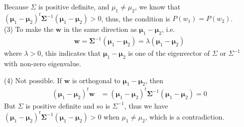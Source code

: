 \documentclass{article}
\begin{document}
Because $\Sigma$ is positive definite, and $\mu_1 \neq \mu_2$, we know that 
$(\mathbf{\mu}_1 - \mathbf{\mu}_2)^t\mathbf{\Sigma}^{-1}(\mathbf{\mu}_1 - \mathbf{\mu}_2) > 0$, thus, the condition is $P(w_1) = P(w_2)$.  
\\
\vspace{0.2in}
(3) To make the $\mathbf{w}$ in the same direction as $\mathbf{\mu}_1 - \mathbf{\mu}_2$, i.e.
\begin{align}
    \mathbf{w} = \mathbf{\Sigma}^{-1}(\mathbf{\mu}_1 - \mathbf{\mu}_2) = \lambda (\mathbf{\mu}_1 - \mathbf{\mu}_2)
\end{align}
where $\lambda > 0$, this indicates that $\mathbf{\mu}_1 - \mathbf{\mu}_2$ is one of the eigenvector of $\Sigma$ or $\Sigma^{-1}$ with non-zero eigenvalue.

(4) Not possible. If $\mathbf{w}$ is orthogonal to $\mathbf{\mu}_1 - \mathbf{\mu}_2$, then
\begin{align}
(\mathbf{\mu}_1 - \mathbf{\mu}_2)^t\mathbf{w} &= (\mathbf{\mu}_1 - \mathbf{\mu}_2)^t \mathbf{\Sigma}^{-1} (\mathbf{\mu}_1 - \mathbf{\mu}_2) = 0
\end{align}
But $\Sigma$ is positive definite and so is $\Sigma^{-1}$, thus we have $(\mathbf{\mu}_1 - \mathbf{\mu}_2)^t \mathbf{\Sigma}^{-1} (\mathbf{\mu}_1 - \mathbf{\mu}_2) > 0 $ when $\mu_1 \neq \mu_2$, which is a contradiction.
\end{document}
